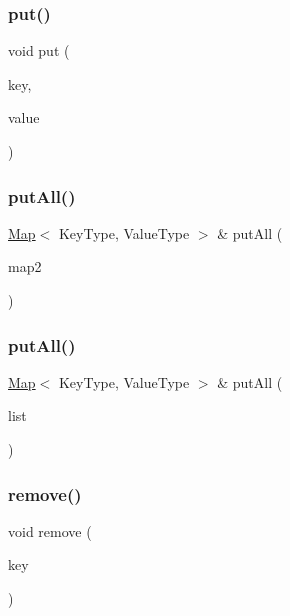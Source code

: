 \subsubsection{\texorpdfstring{put()}{put()}}
{\footnotesize\ttfamily void put (\begin{DoxyParamCaption}\item[{const Key\+Type \&}]{key,  }\item[{const Value\+Type \&}]{value }\end{DoxyParamCaption})}

\mbox{\label{classMap_aa8f04a9b5782a099d73bb66377d9c110}} 
\subsubsection{\texorpdfstring{put\+All()}{putAll()}\hspace{0.1cm}{\footnotesize\ttfamily [1/2]}}
{\footnotesize\ttfamily \mbox{\hyperlink{classMap}{Map}}$<$ Key\+Type, Value\+Type $>$ \& put\+All (\begin{DoxyParamCaption}\item[{const \mbox{\hyperlink{classMap}{Map}}$<$ Key\+Type, Value\+Type $>$ \&}]{map2 }\end{DoxyParamCaption})}

\mbox{\label{classMap_a5703d038cf94b188b8a52c33b89944b5}} 
\subsubsection{\texorpdfstring{put\+All()}{putAll()}\hspace{0.1cm}{\footnotesize\ttfamily [2/2]}}
{\footnotesize\ttfamily \mbox{\hyperlink{classMap}{Map}}$<$ Key\+Type, Value\+Type $>$ \& put\+All (\begin{DoxyParamCaption}\item[{std\+::initializer\+\_\+list$<$ std\+::pair$<$ Key\+Type, Value\+Type $>$ $>$}]{list }\end{DoxyParamCaption})}

\mbox{\label{classMap_ac6e7e5198a9f1c8b2cc40fbd1d0eb3b0}} 
\subsubsection{\texorpdfstring{remove()}{remove()}}
{\footnotesize\ttfamily void remove (\begin{DoxyParamCaption}\item[{const Key\+Type \&}]{key }\end{DoxyParamCaption})}

